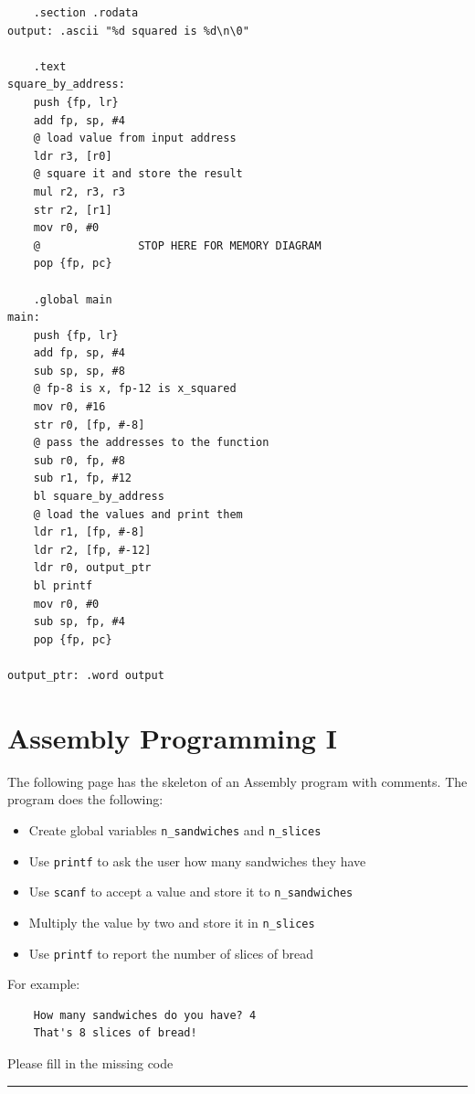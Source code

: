 \documentclass[12pt]{article}
\begin{document}
\begin{verbatim}
    .section .rodata
output: .ascii "%d squared is %d\n\0"

    .text
square_by_address:
    push {fp, lr}
    add fp, sp, #4
    @ load value from input address
    ldr r3, [r0]
    @ square it and store the result
    mul r2, r3, r3
    str r2, [r1]
    mov r0, #0
    @               STOP HERE FOR MEMORY DIAGRAM
    pop {fp, pc}

    .global main
main: 
    push {fp, lr}
    add fp, sp, #4
    sub sp, sp, #8
    @ fp-8 is x, fp-12 is x_squared
    mov r0, #16
    str r0, [fp, #-8]
    @ pass the addresses to the function
    sub r0, fp, #8
    sub r1, fp, #12
    bl square_by_address
    @ load the values and print them
    ldr r1, [fp, #-8]
    ldr r2, [fp, #-12]
    ldr r0, output_ptr
    bl printf
    mov r0, #0
    sub sp, fp, #4
    pop {fp, pc}

output_ptr: .word output
\end{verbatim}



\section*{Assembly Programming I}

The following page has the skeleton of an Assembly program with comments. The program does the following:
\begin{itemize}
    \item Create global variables \texttt{n\_sandwiches} and \texttt{n\_slices}
    \item Use \texttt{printf} to ask the user how many sandwiches they have
    \item Use \texttt{scanf} to accept a value and store it to \texttt{n\_sandwiches}
    \item Multiply the value by two and store it in \texttt{n\_slices}
    \item Use \texttt{printf} to report the number of slices of bread
\end{itemize}

For example:
\begin{verbatim}
    How many sandwiches do you have? 4
    That's 8 slices of bread!
\end{verbatim}

Please fill in the missing code

\vfill

\rule[1ex]{\textwidth}{.1pt}
\end{document}
